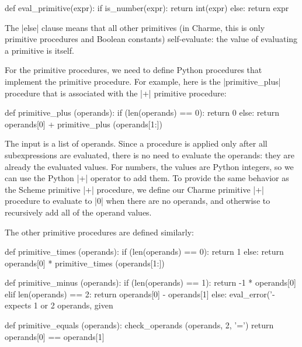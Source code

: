 \begin{pythoncode}
def eval_primitive(expr):
    if is_number(expr): return int(expr)
    else: return expr
\end{pythoncode}

The \pycode|else| clause means that all other primitives (in Charme, this is only primitive procedures and Boolean constants) self-evaluate: the value of evaluating a primitive is itself.  

For the primitive procedures, we need to define Python procedures that implement the primitive procedure.  For example, here is the \pycode|primitive_plus| procedure that is associated with the \scheme|+| primitive procedure:
\begin{pythoncode}
def primitive_plus (operands):
    if (len(operands) == 0): return 0
    else: return operands[0] + primitive_plus (operands[1:])
\end{pythoncode}

The input is a list of operands.  Since a procedure is applied only after all subexpressions are evaluated, there is no need to evaluate the operands: they are already the evaluated values.  For numbers, the values are Python integers, so we can use the Python \pycode|+| operator to add them.  To provide the same behavior as the Scheme primitive \scheme|+| procedure, we define our Charme primitive \scheme|+| procedure to evaluate to \schemeresult|0| when there are no operands, and otherwise to recursively add all of the operand values.

The other primitive procedures are defined similarly:
\begin{pythoncode}
def primitive_times (operands):
    if (len(operands) == 0): return 1
    else: return operands[0] * primitive_times (operands[1:])
\end{pythoncode}

\begin{pythoncode}    
def primitive_minus (operands):
    if (len(operands) == 1): return -1 * operands[0]
    elif len(operands) == 2: return operands[0] - operands[1]
    else: 
       eval_error('- expects 1 or 2 operands, given %
\end{pythoncode}

\begin{pythoncode}    
def primitive_equals (operands):
    check_operands (operands, 2, '=')
    return operands[0] == operands[1]
\end{pythoncode}

